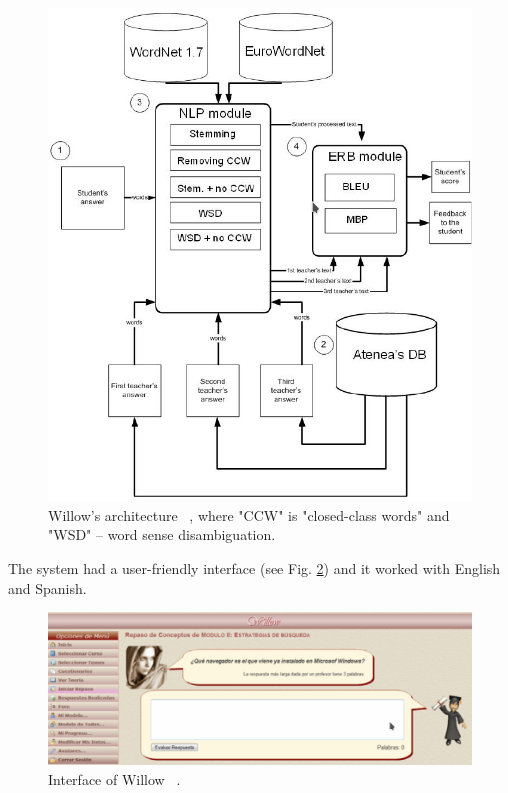 \documentclass[11pt]{report}
\numberwithin{equation}{section} %
\begin{document}
 \begin{figure}[h!]
  \centering
  \includegraphics[width=\textwidth]{img/WillowArch}
    \caption{ Willow's architecture ~\cite{Willow}, where "CCW" is "closed-class words" and "WSD" -- word sense disambiguation.}\label{fig:WillowArch}
\end{figure}

The system had a user-friendly interface (see Fig. \ref{fig:Willow}) and it worked with English and Spanish.\\

\begin{figure}[h!]
  \centering
  \includegraphics[width=\textwidth]{img/Willow}
    \caption{ Interface of Willow ~\cite{Willow}. }\label{fig:Willow}
\end{figure}
\end{document}
